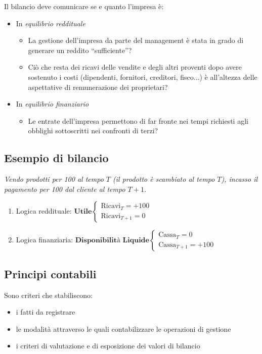 Il bilancio deve comunicare se e quanto l’impresa è:
\begin{itemize}
    \item In \emph{equilibrio reddituale}
    \begin{itemize}
        \item La gestione dell’impresa da parte del management è stata in grado di generare un reddito ``sufficiente''?
        \item Ciò che resta dei ricavi delle vendite e degli altri proventi dopo avere sostenuto i costi
        (dipendenti, fornitori, creditori, fisco...) è all’altezza delle aspettative di remunerazione dei proprietari?
    \end{itemize}
    \item In \emph{equilibrio finanziario}
    \begin{itemize}
        \item Le entrate dell’impresa permettono di far fronte nei tempi richiesti agli obblighi sottoscritti nei confronti di terzi?
    \end{itemize}
\end{itemize}

\subsection{Esempio di bilancio}
\textit{Vendo prodotti per 100 al tempo $T$ (il prodotto è scambiato al tempo $T$), incasso il pagamento per 100 dal cliente al tempo $T+1$.}
\begin{enumerate}
    \item Logica reddituale: \quad
    $
        \textbf{Utile}
        \begin{cases}
            \text{Ricavi}_T = +100\\
            \text{Ricavi}_{T+1} = 0
        \end{cases}
    $
    \item Logica finanziaria: \quad
    $
    \textbf{Disponibilità Liquide}
    \begin{cases}
        \text{Cassa}_T = 0\\
        \text{Cassa}_{T+1} = +100
    \end{cases}
    $
\end{enumerate}

\subsection{Principi contabili}
Sono criteri che stabiliscono:
\begin{itemize}
    \item i fatti da registrare
    \item le modalità attraverso le quali contabilizzare le operazioni di gestione
    \item i criteri di valutazione e di esposizione dei valori di bilancio
\end{itemize}

